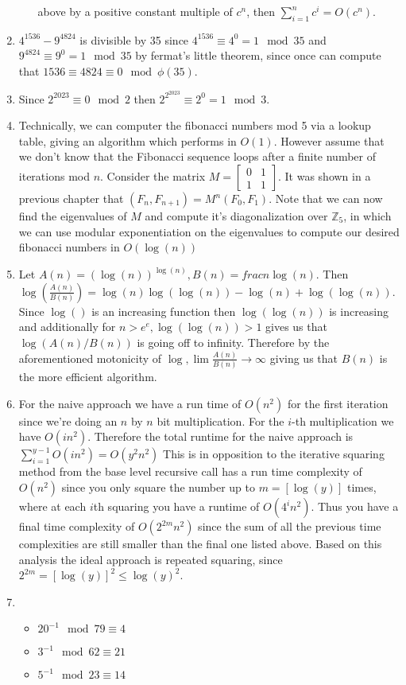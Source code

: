\documentclass[12pt, letterpaper]{article}
\newcommand{\Z}{\mathbb{Z}}
\begin{document}
\begin{enumerate}
\begin{enumerate}
		above by a positive constant multiple of $c^n$, then 
		$\sum_{i=1}^n c^i = O(c^n)$.  
	\end{enumerate}
	\item $4^{1536} - 9^{4824}$ is divisible by 35 since 
	$4^{1536} \equiv 4^0 = 1 \mod{35}$ and $9^{4824} \equiv 9^0 = 1 \mod{35}$ by 
	fermat's little theorem, since once can compute that 
	$1536 \equiv 4824 \equiv 0 \mod{\phi(35)}$.
	\item Since $2^{2023} \equiv 0 \mod{2}$ then $2^{2^{2023}} \equiv 2^0 = 1 \mod{3}$.
	\item Technically, we can computer the fibonacci numbers mod 5 via a lookup 
	table, giving an algorithm which performs in $O(1)$.  However assume that we 
	don't know that the Fibonacci sequence loops after a finite number of 
	iterations mod $n$.  Consider the matrix 
	$M = \begin{bmatrix} 0 & 1\\ 1 & 1	\end{bmatrix}$.  
	It was shown in a previous chapter that 	$(F_n, F_{n+1}) = M^n (F_0, F_1)$.
	Note that we can now find the eigenvalues of $M$ and compute it's
	diagonalization over $\Z_5$, in which we can use modular exponentiation on the 
	eigenvalues to compute our desired fibonacci numbers in $O(\log(n))$
	\item Let $A(n) = (\log(n))^{\log(n)}, B(n) = frac{n}{\log(n)}$.  Then 
	$\log\left(\frac{A(n)}{B(n)}\right) = \log(n)\log(\log(n)) - \log(n) + \log(\log(n))$.  Since $\log()$ is an increasing function then $\log(\log(n))$ 
	is increasing and additionally for $n > e^e, \log(\log(n)) > 1$ gives us 
	that $\log(A(n)/B(n))$ is going off to infinity.  Therefore by the aforementioned motonicity of $\log, \lim \frac{A(n)}{B(n)} \to \infty$ giving us 
	that $B(n)$ is the more efficient algorithm.  
	\item For the naive approach we have a run time of $O(n^2)$ for
	the first iteration since we're doing an $n$ by $n$ bit multiplication.
	For the $i$-th multiplication we have $O(in^2)$.  Therefore the total 
	runtime for the naive approach is $\sum_{i=1}^{y-1} O(i n^2) = O(y^2n^2)$
	 This is in opposition to the iterative squaring method from the base level
	 recursive call has a run time complexity of $O(n^2)$
	since you only square the number up to $m = [\log(y)]$ times, where at each $i$th 
	squaring you have a runtime of $O(4^i n^2)$.  Thus you have a final time 
	complexity of $O(2^{2m} n^2)$ since the sum of all the previous time complexities 
	are still smaller than the final one listed above.  Based on this analysis 
	the ideal approach is repeated squaring, since $2^{2m} = [\log(y)]^2 \leq \log(y)^2$. 
	\item 
	\begin{itemize}
		\item $20^{-1} \mod{79} \equiv 4$
		\item $3^{-1} \mod{62} \equiv 21$
		\item $5^{-1} \mod{23} \equiv 14$
	\end{itemize}
	
\end{enumerate}
\end{document}
